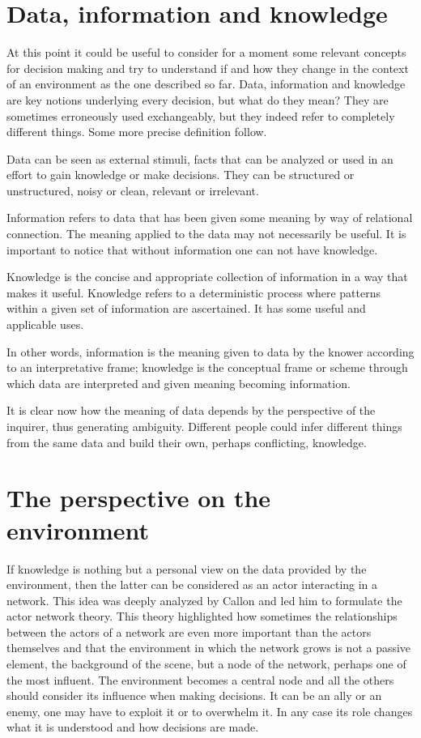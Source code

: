 \section{Data, information and knowledge}

At this point it could be useful to consider for a moment some relevant concepts for decision making and try to understand if and how they change in the context of an environment as the one described so far. Data, information and knowledge are key notions underlying every decision, but what do they mean? They are sometimes erroneously used exchangeably, but they indeed refer to completely different things. Some more precise definition follow.

Data can be seen as external stimuli, facts that can be analyzed or used in an effort to gain knowledge or make decisions. They can be structured or unstructured, noisy or clean, relevant or irrelevant.

Information refers to data that has been given some meaning by way of relational connection. The meaning applied to the data may not necessarily be useful. It is important to notice that without information one can not have knowledge.

Knowledge is the concise and appropriate collection of information in a way that makes it useful. Knowledge refers to a deterministic process where patterns within a given set of information are ascertained. It has some useful and applicable uses.

In other words, information is the meaning given to data by the knower according to an interpretative frame; knowledge is the conceptual frame or scheme through which data are interpreted and given meaning becoming information.

It is clear now how the meaning of data depends by the perspective of the inquirer, thus generating ambiguity. Different people could infer different things from the same data and build their own, perhaps conflicting, knowledge.

\section{The perspective on the environment}
If knowledge is nothing but a personal view on the data provided by the environment, then the latter can be considered as an actor interacting in a network. This idea was deeply analyzed by Callon \cite{10} and led him to formulate the actor network theory. This theory highlighted how sometimes the relationships between the actors of a network are even more important than the actors themselves and that the environment in which the network grows is not a passive element, the background of the scene, but a node of the network, perhaps one of the most influent. The environment becomes a central node and all the others should consider its influence when making decisions. It can be an ally or an enemy, one may have to exploit it or to overwhelm it. In any case its role changes what it is understood and how decisions are made.

